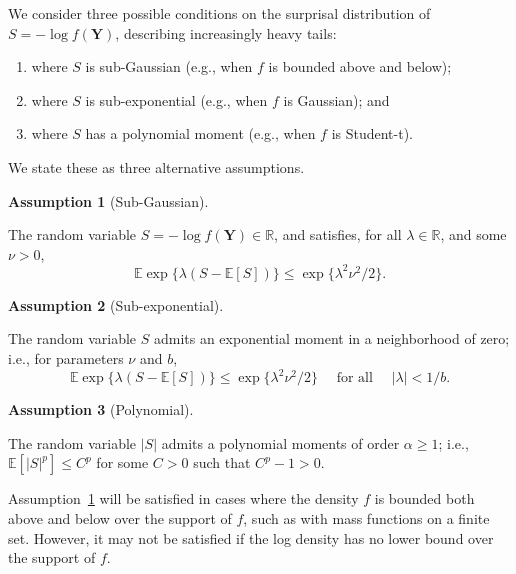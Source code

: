 \documentclass[
  12pt]{article}
\providecommand{\tightlist}{%
  \setlength{\itemsep}{0pt}\setlength{\parskip}{0pt}}
\newcommand{\E}{\mathbb{E}}
\theoremstyle{plain}
\theoremstyle{plain}
\theoremstyle{definition}
\newtheorem{definition}{Assumption}[section]
\theoremstyle{plain}
\theoremstyle{remark}
\begin{document}
We consider three possible conditions on the surprisal distribution of
\(S = -\log f(\bm{Y})\), describing increasingly heavy tails:

\begin{enumerate}
\def\labelenumi{\arabic{enumi}.}
\tightlist
\item
  where \(S\) is sub-Gaussian (e.g., when \(f\) is bounded above and
  below);
\item
  where \(S\) is sub-exponential (e.g., when \(f\) is Gaussian); and
\item
  where \(S\) has a polynomial moment (e.g., when \(f\) is Student-t).
\end{enumerate}

We state these as three alternative assumptions.

\begin{definition}[Sub-Gaussian]\protect\hypertarget{def-bounded}{}\label{def-bounded}

The random variable \(S =-\log f(\bm{Y})\in\mathbb{R}\), and satisfies,
for all \(\lambda\in\mathbb{R}\), and some \(\nu>0\), \[
    \E \exp\{\lambda (S-\E[S])\}\le \exp\{\lambda^2 \nu^2/2\}.
\]

\end{definition}

\begin{definition}[Sub-exponential]\protect\hypertarget{def-subbounded}{}\label{def-subbounded}

The random variable \(S\) admits an exponential moment in a neighborhood
of zero; i.e., for parameters \(\nu\) and \(b\), \[
    \E \exp\{\lambda(S-\E[S])\} \leq \exp\{\lambda^2\nu^2/ 2\} \quad\text{ for all } \quad |\lambda|< 1/b.
\]

\end{definition}

\begin{definition}[Polynomial]\protect\hypertarget{def-polybounded}{}\label{def-polybounded}

The random variable \(|S|\) admits a polynomial moments of order
\(\alpha\ge 1\); i.e., \(\E[|S|^p] \le C^p\) for some \(C>0\) such that
\(C^p-1>0\).

\end{definition}

Assumption~\ref{def-bounded} will be satisfied in cases where the
density \(f\) is bounded both above and below over the support of \(f\),
such as with mass functions on a finite set. However, it may not be
satisfied if the log density has no lower bound over the support of
\(f\).
\end{document}
